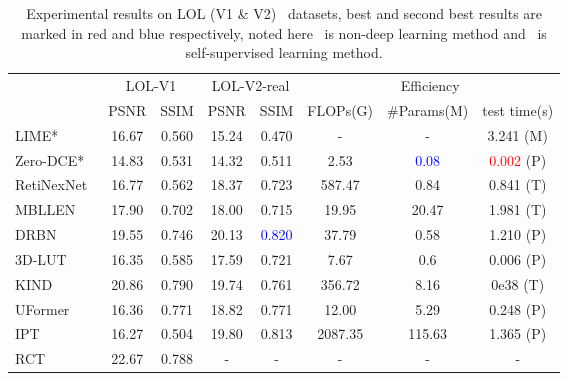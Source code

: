\documentclass{bmvc2k}
\newcommand{\red}[1]{\textcolor{red}{#1}}
\newcommand{\blue}[1]{\textcolor{blue}{#1}}
\begin{document}
\begin{table}[t]
\caption{Experimental results on LOL (V1 \& V2)~\cite{LOL_dataset} datasets, best and second best results are marked in red and blue respectively, noted here~\cite{LIME} is non-deep learning method and~\cite{zero_dce} is self-supervised learning method.}\label{tab:LOL}
\centering
\setlength\tabcolsep{4pt}
\begin{adjustbox}{max width = 0.95\linewidth}
\begin{tabular}{l|cc|cc|ccc}
\Xhline{1.0pt}
\multirow{2}{*}{Methods}         & \multicolumn{2}{c|}{LOL-V1} & \multicolumn{2}{c|}{LOL-V2-real} & \multicolumn{3}{c}{Efficiency}             \\ \cline{2-8}  & PSNR & SSIM & PSNR & SSIM   & FLOPs(G) & \#Params(M) & test time(s) \\ \Xhline{0.6pt}
LIME*~\cite{LIME}                  & 16.67        & 0.560        & 15.24        & 0.470        & -         & -              & 3.241 (M)     \\
Zero-DCE*~\cite{zero_dce}    & 14.83        & 0.531        & 14.32        & 0.511        & 2.53      & \blue{0.08}           & \red{0.002} (P)     \\
RetiNexNet~\cite{LOL_dataset}   & 16.77        & 0.562        & 18.37        & 0.723        & 587.47    & 0.84           & 0.841 (T)     \\
MBLLEN~\cite{Lv2018MBLLEN}  & 17.90        & 0.702        & 18.00        & 0.715        & 19.95     & 20.47          & 1.981 (T)     \\
DRBN~\cite{DRBN_CVPR}    & 19.55        & 0.746        & 20.13        & \blue{0.820}        & 37.79     & 0.58           & 1.210 (P)     \\
3D-LUT~\cite{3DLUT}     & 16.35        & 0.585        & 17.59        & 0.721        & 7.67      & 0.6            & 0.006 (P)     \\
KIND~\cite{KIND}   & 20.86        & 0.790        & 19.74        & 0.761        & 356.72    & 8.16           & 0e38 (T)     \\
UFormer~\cite{Wang2022Uformer}      & 16.36        & 0.771        & 18.82        & 0.771        & 12.00     & 5.29           & 0.248 (P)     \\
IPT~\cite{IPT_CVPR}      & 16.27        & 0.504        & 19.80        & 0.813        & 2087.35   & 115.63         & 1.365 (P)     \\
RCT~\cite{RCT_ICCV21}       & 22.67       & 0.788        & -            & -            & -         & -              & -  \\       

\end{tabular}
\end{adjustbox}
\end{table}
\end{document}
